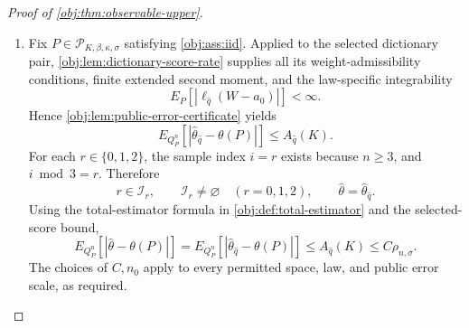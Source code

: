 \documentclass[11pt]{article}
\begin{document}
\begin{proof}[Proof of \cref{obj:thm:observable-upper}]
\begin{enumerate}
\item Fix \(P\in\mathcal P_{K,\beta,\kappa,\sigma}\) satisfying \cref{obj:ass:iid}. Applied to the selected dictionary pair, \cref{obj:lem:dictionary-score-rate} supplies all its weight-admissibility conditions, finite extended second moment, and the law-specific integrability
\[
E_P\!\left[|\ell_{\widehat q}(W-a_0)|\right]<\infty.
\]
Hence \cref{obj:lem:public-error-certificate} yields
\[
E_{Q_P^n}\!\left[
|\widehat\theta_{\widehat q}-\theta(P)|
\right]\le A_{\widehat q}(K).
\]
For each \(r\in\{0,1,2\}\), the sample index \(i=r\) exists because \(n\ge3\), and \(i\bmod3=r\). Therefore
\[
r\in\mathcal I_r,\qquad
\mathcal I_r\ne\varnothing\quad(r=0,1,2),
\qquad
\widehat\theta=\widehat\theta_{\widehat q}.
\]
Using the total-estimator formula in \cref{obj:def:total-estimator} and the selected-score bound,
\[
E_{Q_P^n}\!\left[|\widehat\theta-\theta(P)|\right]
=
E_{Q_P^n}\!\left[
|\widehat\theta_{\widehat q}-\theta(P)|
\right]
\le A_{\widehat q}(K)
\le C\rho_{n,\sigma}.
\]
The choices of \(C,n_0\) apply to every permitted space, law, and public error scale, as required. %
\end{enumerate}
\end{proof}
\end{document}
